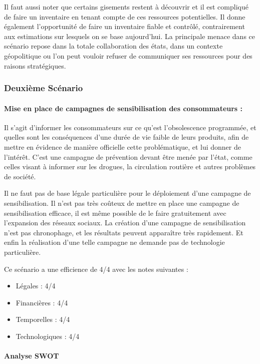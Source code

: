 Il faut aussi noter que certains gisements restent à découvrir et il est compliqué de faire un inventaire en tenant compte de ces ressources potentielles.
Il donne également l’opportunité de faire un inventaire fiable et contrôlé, contrairement aux estimations sur lesquels on se base aujourd’hui.
\medbreak
La principale menace dans ce scénario repose dans la totale collaboration des états, dans un contexte géopolitique ou l’on peut vouloir refuser de communiquer ses ressources pour des raisons stratégiques.


\subsubsection{Deuxième Scénario}

\paragraph{Mise en place de campagnes de sensibilisation des consommateurs :}

\medbreak
Il s’agit d’informer les consommateurs sur ce qu’est l’obsolescence programmée, et quelles sont les conséquences d’une durée de vie faible de leurs produits, afin de mettre en évidence de manière officielle cette problématique, et lui donner de l'intérêt. C’est une campagne de prévention devant être menée par l’état, comme celles visant à informer sur les drogues, la circulation routière et autres problèmes de société.

\medbreak
Il ne faut pas de base légale particulière pour le déploiement d’une campagne de sensibilisation.
Il n’est pas très coûteux de mettre en place une campagne de sensibilisation efficace, il est même possible de le faire gratuitement avec l'expansion des réseaux sociaux.
La création d’une campagne de sensibilisation n’est pas chronophage, et les résultats peuvent apparaître très rapidement.
Et enfin la réalisation d’une telle campagne ne demande pas de technologie particulière.

Ce scénario a une efficience de 4/4 avec les notes suivantes :
\begin{itemize}
\item Légales : 4/4
\item Financières : 4/4
\item Temporelles : 4/4
\item Technologiques : 4/4
\end{itemize}

\paragraph{Analyse SWOT}

